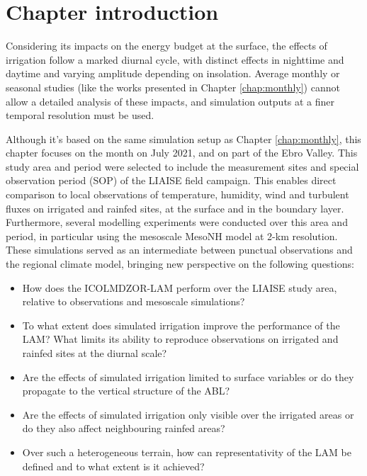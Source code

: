 \section{Chapter introduction}

Considering its impacts on the energy budget at the surface, the effects of irrigation follow a marked diurnal cycle, with distinct effects in nighttime and daytime and varying amplitude depending on insolation. Average monthly or seasonal studies (like the works presented in Chapter \ref{chap:monthly}) cannot allow a detailed analysis of these impacts, and simulation outputs at a finer temporal resolution must be used.

Although it's based on the same simulation setup as Chapter \ref{chap:monthly}, this chapter focuses on the month on July 2021, and on part of the Ebro Valley. This study area and period were selected to include the measurement sites and special observation period (SOP) of the LIAISE field campaign. This enables direct comparison to local observations of temperature, humidity, wind and turbulent fluxes on irrigated and rainfed sites, at the surface and in the boundary layer. Furthermore, several modelling experiments were conducted over this area and period, in particular using the mesoscale MesoNH model at 2-km resolution. These simulations served as an intermediate between punctual observations and the regional climate model, bringing new perspective on the following questions:

\begin{itemize}
    \item How does the ICOLMDZOR-LAM perform over the LIAISE study area, relative to observations and mesoscale simulations?
    \item To what extent does simulated irrigation improve the performance of the LAM? What limits its ability to reproduce observations on irrigated and rainfed sites at the diurnal scale?
    \item Are the effects of simulated irrigation limited to surface variables or do they propagate to the vertical structure of the ABL? 
    \item Are the effects of simulated irrigation only visible over the irrigated areas or do they also affect neighbouring rainfed areas?
    \item Over such a heterogeneous terrain, how can representativity of the LAM be defined and to what extent is it achieved?
\end{itemize}

